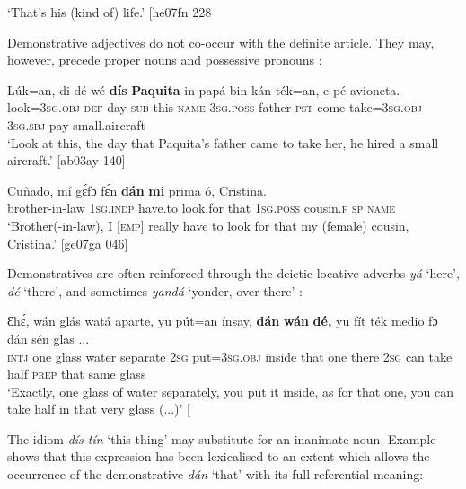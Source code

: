 \glt ‘That’s his (kind of) life.’ [he07fn 228\textstylePichiexamplenumberZchnZchn{]}
\z

Demonstrative adjectives do not co-occur with the definite article. They may, however, precede proper nouns  and possessive pronouns :


\ea%
    \label{ex:key:200}
    \gll Lúk=an,    di  dé  wé  \textbf{dís} \textbf{ Paquita}  in    papá
bin  kán    ték=an,    e    pé  avioneta.\\
look=\textsc{3sg.obj}  \textsc{def}  day  \textsc{sub}  this  \textsc{name}  \textsc{3sg.poss}  father 
\textsc{pst}  come  take=\textsc{3sg.obj}  \textsc{3sg.sbj}  pay  small.aircraft\\

\glt ‘Look at this, the day that Paquita’s father came to take her, 
he hired a small aircraft.’ [ab03ay 140]
\z


\ea%
    \label{ex:key:201}
    \gll Cuñado,      mí    gɛ́fɔ    fɛ́n    \textbf{dán}  \textbf{mi}
prima  ó,  Cristina.\\
brother-in-law  \textsc{1sg.indp}  have.to  look.for  that  \textsc{1sg.poss} 
cousin.\textsc{f}  \textsc{sp}  \textsc{name}\\

\glt ‘Brother(-in-law), I [\textsc{emp}] really have to look for that my 
(female) cousin, Cristina.’ [ge07ga 046]
\z

Demonstratives are often reinforced through the deictic locative adverbs \textit{yá} ‘here’, \textit{dé} ‘there’, and sometimes \textit{yandá} ‘yonder, over there’ :


\ea%
    \label{ex:key:202}
    \gll Ɛhɛ́,    wán  glás    watá  aparte,  yu  pút=an    ínsay,  \textbf{dán}  \textbf{wán}
\textbf{dé,}    yu  fít  ték    medio  fɔ  dán    sén    glas  \op...\cp\\
\textsc{intj}    one  glass  water  separate  \textsc{2sg}  put=\textsc{3sg.obj}  inside  that  one
there  \textsc{2sg}  can  take    half    \textsc{prep}  that    same  glass  \\

\glt ‘Exactly, one glass of water separately, you put it inside, as for that one, you can 
take half in that very glass (...)’ [\textstylePichiexamplenumberZchnZchn{dj03do 054]}
\z

The idiom \textit{dís-tín} ‘this-thing’ may substitute for an inanimate noun. Example  shows that this expression has been lexicalised to an extent which allows the occurrence of the demonstrative \textit{dán} ‘that’ with its full referential meaning: 


